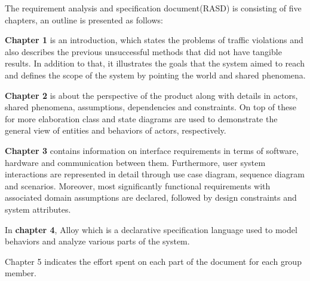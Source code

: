 The requirement analysis and specification document(RASD) is consisting of five chapters, an outline is presented as follows:

\textbf{Chapter 1} is an introduction, which states the problems of traffic violations and also describes the previous unsuccessful methods that did not have tangible results. In addition to that, it illustrates the goals that the system aimed to reach and defines the scope of the system by pointing the world and shared phenomena.

\textbf{Chapter 2} is about the perspective of the product along with details in actors, shared phenomena, assumptions, dependencies and constraints. On top of these for more elaboration class and state diagrams are used to demonstrate the general view of entities and behaviors of actors, respectively.

\textbf{Chapter 3} contains information on interface requirements in terms of software, hardware and communication between them. Furthermore, user system interactions are represented in detail through use case diagram, sequence diagram and scenarios. Moreover, most significantly functional requirements with associated domain assumptions are declared, followed by design constraints and system attributes.

In \textbf{chapter 4}, Alloy which is a declarative specification language used to model behaviors and analyze various parts of the system.

Chapter 5 indicates the effort spent on each part of the document for each group member.
